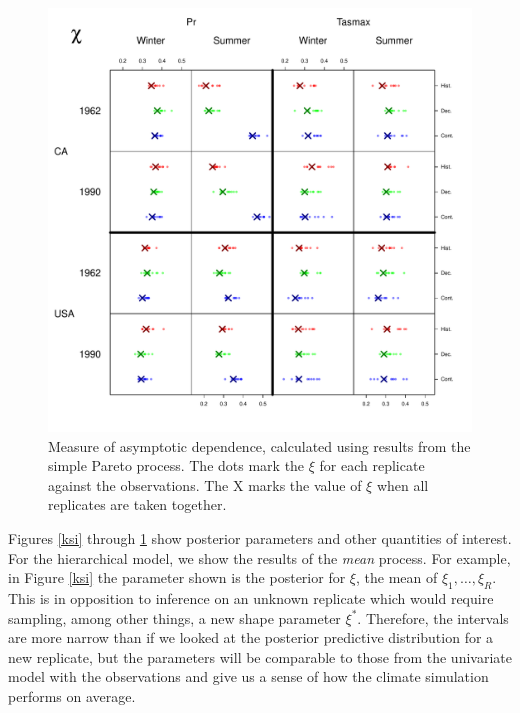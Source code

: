 \begin{figure}
\begin{center}
\includegraphics[scale=0.72]{figs/chi4.pdf}
\end{center}
\caption{Measure of asymptotic dependence, calculated using results from the simple Pareto process. The dots mark the $\xi$ for each replicate against the observations. The X marks the value of $\xi$ when all replicates are taken together.}
\label{theta}
\end{figure}


Figures \ref{ksi} through \ref{theta} show posterior parameters and other quantities of interest. For the hierarchical model, we show the results of the \emph{mean} process. For example, in Figure \ref{ksi} the parameter shown is the posterior for $\xi$, the mean of $\xi_1,\ldots,\xi_R$. This is in opposition to inference on an unknown replicate which would require sampling, among other things, a new shape parameter $\xi^*$. Therefore, the intervals are more narrow than if we looked at the posterior predictive distribution for a new replicate, but the parameters will be comparable to those from the univariate model with the observations and give us a sense of how the climate simulation performs on average.

